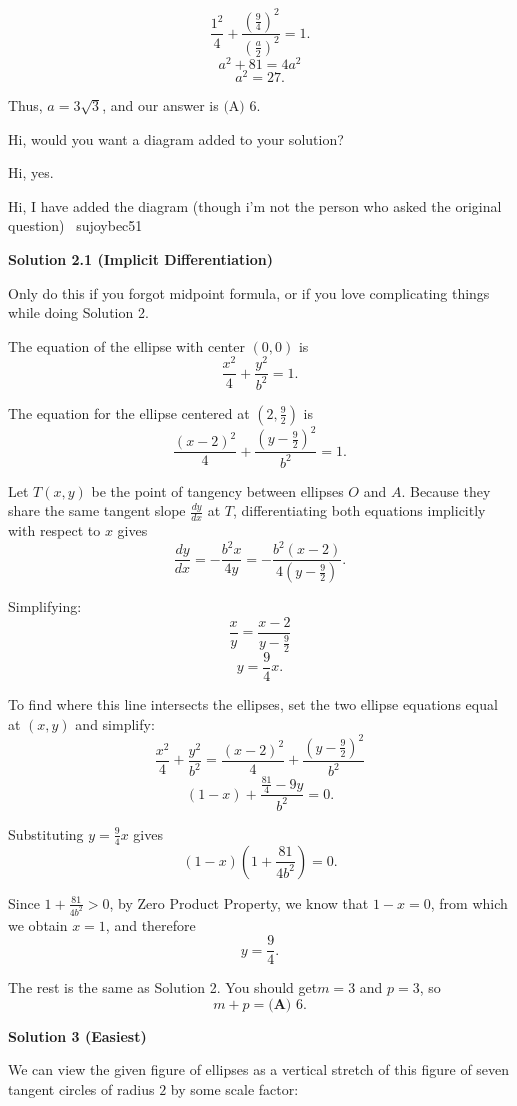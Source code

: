 \begin{enumerate}
 
 \[\frac{1^2}{4} + \frac{(\frac94)^2}{(\frac{a}{2})^2}=1.\]
 \[a^2 + 81 = 4a^2\]
 \[a^2 = 27.\]

 Thus, $a = 3\sqrt3$, and our answer is $\boxed{\text{(A) }6}.$

 Hi, would you want a diagram added to your solution?

 Hi, yes.

 Hi, I have added the diagram (though i'm not the person who asked the original question) ~sujoybec51

 


 



\textbf{Solution 2.1 (Implicit Differentiation)}

Only do this if you forgot midpoint formula, or if you love complicating things while doing Solution 2.

 The equation of the ellipse with center $(0,0)$ is 
 \[\frac{x^2}{4} + \frac{y^2}{b^2} = 1.\]

 The equation for the ellipse centered at $(2, \frac{9}{2})$ is
 \[\frac{(x - 2)^2}{4} + \frac{\left(y - \frac{9}{2}\right)^2}{b^2} = 1.\]

 Let $T(x, y)$ be the point of tangency between ellipses $O$ and $A$. Because they share the same tangent slope $\frac{dy}{dx}$ at $T$, differentiating both equations implicitly with respect to $x$ gives
 \[\frac{dy}{dx} = -\frac{b^2 x}{4y} = -\frac{b^2(x - 2)}{4\left(y - \frac{9}{2}\right)}.\]

 Simplifying:
 \[\frac{x}{y} = \frac{x - 2}{y - \frac{9}{2}}\]
 \[y = \frac{9}{4}x.\]

 To find where this line intersects the ellipses, set the two ellipse equations equal at $(x, y)$ and simplify:
 \[\frac{x^2}{4} + \frac{y^2}{b^2} = \frac{(x - 2)^2}{4} + \frac{\left(y - \frac{9}{2}\right)^2}{b^2}\]
 \[(1 - x) + \frac{\frac{81}{4} - 9y}{b^2} = 0.\]

 Substituting $y = \frac{9}{4}x$ gives
 \[(1 - x)\left(1 + \frac{81}{4b^2}\right) = 0.\]

 Since $1 + \frac{81}{4b^2} > 0$, by Zero Product Property, we know that $1 - x = 0$, from which we obtain $x = 1$, and therefore
 \[y = \frac{9}{4}.\]

 The rest is the same as Solution 2. You should get$m = 3$ and $p = 3$, so
 \[m + p = \boxed{\textbf{(A) }6}.\]




\textbf{Solution 3 (Easiest)}

We can view the given figure of ellipses as a vertical stretch of this figure of seven tangent circles of radius $2$ by some scale factor: 


\end{enumerate}
